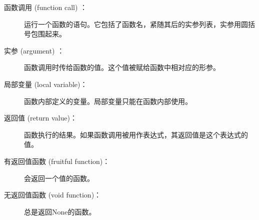 \begin{description}

\item[函数调用 (function call) ：] 运行一个函数的语句。它包括了函数名，紧随其后的实参列表，实参用圆括号包围起来。
  


\item[实参 (argument) ：] 函数调用时传给函数的值。这个值被赋给函数中相对应的形参。
  


\item[局部变量 (local variable)：] 函数内部定义的变量。局部变量只能在函数内部使用。
  


\item[返回值 (return value)：] 函数执行的结果。如果函数调用被用作表达式，其返回值是这个表达式的值。
  


\item[有返回值函数 (fruitful function)：] 会返回一个值的函数。
  


\item[无返回值函数 (void function)：]     总是返回None的函数。
  



\end{description}
